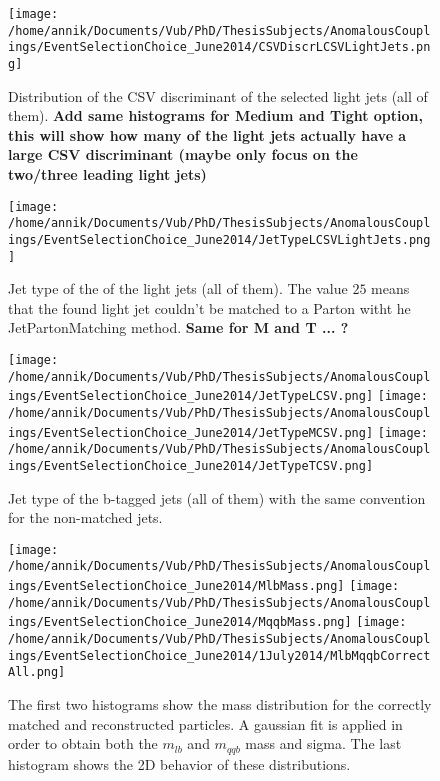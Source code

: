 \documentclass[a4paper,12pt]{report}
\begin{document}
\begin{center}
\begin{figure}[!h]
\texttt{[image: /home/annik/Documents/Vub/PhD/ThesisSubjects/AnomalousCouplings/EventSelectionChoice\_June2014/CSVDiscrLCSVLightJets.png]}
\caption{ Distribution of the CSV discriminant of the selected light jets (all of them). \textbf{Add same histograms for Medium and Tight option, this will show how many of the light jets actually have a large CSV discriminant (maybe only focus on the two/three leading light jets) }}
\end{figure}

\begin{figure}[!h]
\texttt{[image: /home/annik/Documents/Vub/PhD/ThesisSubjects/AnomalousCouplings/EventSelectionChoice\_June2014/JetTypeLCSVLightJets.png]}
\caption{Jet type of the of the light jets (all of them). The value $25$ means that the found light jet couldn't be matched to a Parton witht he JetPartonMatching method. \textbf{Same for M and T ... ?} }
\end{figure}

\begin{figure}[!h]
\texttt{[image: /home/annik/Documents/Vub/PhD/ThesisSubjects/AnomalousCouplings/EventSelectionChoice\_June2014/JetTypeLCSV.png]}
\texttt{[image: /home/annik/Documents/Vub/PhD/ThesisSubjects/AnomalousCouplings/EventSelectionChoice\_June2014/JetTypeMCSV.png]}
\texttt{[image: /home/annik/Documents/Vub/PhD/ThesisSubjects/AnomalousCouplings/EventSelectionChoice\_June2014/JetTypeTCSV.png]}
\caption{Jet type of the b-tagged jets (all of them) with the same convention for the non-matched jets. }
\end{figure}

\begin{figure}[!h]
\texttt{[image: /home/annik/Documents/Vub/PhD/ThesisSubjects/AnomalousCouplings/EventSelectionChoice\_June2014/MlbMass.png]}
\texttt{[image: /home/annik/Documents/Vub/PhD/ThesisSubjects/AnomalousCouplings/EventSelectionChoice\_June2014/MqqbMass.png]}
\texttt{[image: /home/annik/Documents/Vub/PhD/ThesisSubjects/AnomalousCouplings/EventSelectionChoice\_June2014/1July2014/MlbMqqbCorrectAll.png]}
\caption{The first two histograms show the mass distribution for the correctly matched and reconstructed particles. A gaussian fit is applied in order to obtain both the $m_{lb}$ and $m_{qqb}$ mass and sigma. The last histogram shows the 2D behavior of these distributions. }
\end{figure}
\end{center}
\end{document}
